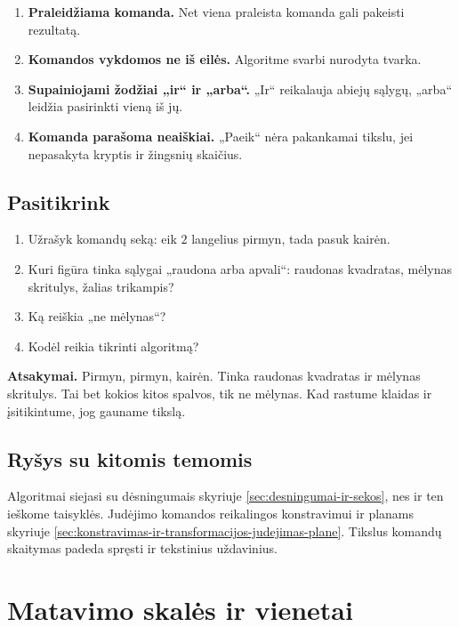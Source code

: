 \begin{enumerate}
\item \textbf{Praleidžiama komanda.} Net viena praleista komanda gali pakeisti rezultatą.
\item \textbf{Komandos vykdomos ne iš eilės.} Algoritme svarbi nurodyta tvarka.
\item \textbf{Supainiojami žodžiai „ir“ ir „arba“.} „Ir“ reikalauja abiejų sąlygų, „arba“ leidžia pasirinkti vieną iš jų.
\item \textbf{Komanda parašoma neaiškiai.} „Paeik“ nėra pakankamai tikslu, jei nepasakyta kryptis ir žingsnių skaičius.
\end{enumerate}

\subsection{Pasitikrink}

\begin{enumerate}
\item Užrašyk komandų seką: eik \(2\) langelius pirmyn, tada pasuk kairėn.
\item Kuri figūra tinka sąlygai „raudona arba apvali“: raudonas kvadratas, mėlynas skritulys, žalias trikampis?
\item Ką reiškia „ne mėlynas“?
\item Kodėl reikia tikrinti algoritmą?
\end{enumerate}

\textbf{Atsakymai.} Pirmyn, pirmyn, kairėn. Tinka raudonas kvadratas ir mėlynas skritulys. Tai bet kokios kitos spalvos, tik ne mėlynas. Kad rastume klaidas ir įsitikintume, jog gauname tikslą.

\subsection{Ryšys su kitomis temomis}

Algoritmai siejasi su dėsningumais skyriuje \ref{sec:desningumai-ir-sekos}, nes ir ten ieškome taisyklės. Judėjimo komandos reikalingos konstravimui ir planams skyriuje \ref{sec:konstravimas-ir-transformacijos-judejimas-plane}. Tikslus komandų skaitymas padeda spręsti ir tekstinius uždavinius.

\section{Matavimo skalės ir vienetai}\label{sec:matavimo-skales-ir-vienetai-pradzia}

